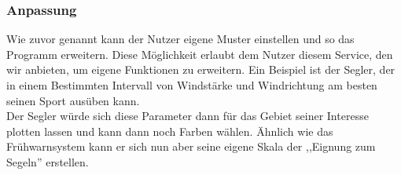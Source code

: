 \documentclass[a4paper,oneside,12pt,titlepage]{article}
\begin{document}
\subsubsection{Anpassung} %
Wie zuvor genannt kann der Nutzer eigene Muster einstellen und so das Programm erweitern. Diese Möglichkeit erlaubt dem Nutzer diesem Service, den wir anbieten, um eigene Funktionen zu erweitern. Ein Beispiel ist der Segler, der in einem Bestimmten Intervall von Windstärke und Windrichtung am besten seinen Sport ausüben kann.\\
Der Segler würde sich diese Parameter dann für das Gebiet seiner Interesse plotten lassen und kann dann noch Farben wählen. Ähnlich wie das Frühwarnsystem kann er sich nun aber seine eigene Skala der ,,Eignung zum Segeln'' erstellen.
\end{document}
